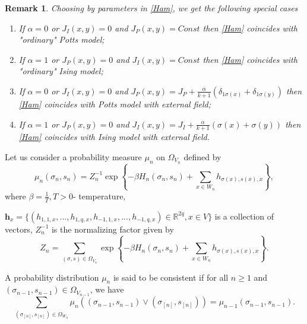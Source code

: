\documentclass[sn-mathphys]{sn-jnl}%
\theoremstyle{thmstyleone}%
\theoremstyle{thmstyletwo}%
\newtheorem{remark}{Remark}%
\theoremstyle{thmstylethree}%
\begin{document}
\begin{remark}\label{comp1} Choosing by parameters in \eqref{Ham}, we get the following special cases
\begin{enumerate}
\item If $\alpha=0$ or  $J_{I}(x,y)=0$ and $J_{P}(x,y)=Const$ then \eqref{Ham} coincides with "ordinary" Potts model;\\[2mm]
 \item If $\alpha=1$ or  $J_{P}(x,y)=0$ and $J_{I}(x,y)=Const$ then \eqref{Ham} coincides with "ordinary" Ising model;\\[2mm]
 \item If $\alpha=0$ or  $J_{I}(x,y)=0$ and $J_{P}(x,y)=J_{P}+\frac{\alpha}{k+1}\left(\delta_{1\sigma(x)}+\delta_{1\sigma(y)}\right)$ then \eqref{Ham} coincides with Potts model with external field;\\[2mm]
  \item If $\alpha=1$ or  $J_{P}(x,y)=0$ and $J_{I}(x,y)=J_{I}+\frac{\alpha}{k+1}\left(\sigma(x)+\sigma(y)\right)$ then \eqref{Ham} coincides with Ising model with external field.\\[2mm]
\end{enumerate}
\end{remark}
Let us consider a probability measure
$\mu_{n}$ on $\Omega_{V_n}$ defined by
\begin{equation}\label{mu}
\mu_{n}(\sigma_n, s_n)=Z_{n}^{-1}\exp\left\{-\beta H_n(\sigma_n,s_n)+\sum _{x\in
W_n}h_{\sigma(x),s(x),x}\right\},
\end{equation}
where $\beta=\frac{1}{T}, T>0$- temperature,

$\textbf{h}_x=\{\left(h_{1,1,x},...,h_{1,q,x},h_{-1,1,x},...,h_{-1,q,x}\right)\in\mathbb R^{2q},x\in V\}$ is a collection of vectors,
 $Z_{n}^{-1}$ is the normalizing factor given by
\begin{equation}\label{ZN1}
Z_{n}=\sum_{(\sigma,s)\in\Omega_{V_n}}\exp\left\{-\beta H_n(\sigma_n,s_n)+\sum _{x\in
W_n}h_{\sigma(x),s(x),x}\right\}.
\end{equation}

A probability distribution
$\mu _{n}$ is said to be consistent if for all $n\geq1$ and
$(\sigma _{n - 1},s_{n-1}) \in {\Omega _{{V_{n - 1}}}}$, we have
\begin{equation}\label{comcon}
\sum\limits_{(\sigma_{[n]}, s_{[n]})  \in {\Omega _{{W_n}}}} {\mu_{n}((\sigma_{n-1}, s_{n-1}) \vee (\sigma_{[n]}, s_{[n]})) = \mu _{n -
1}(\sigma_{n-1}, s_{n-1})}.
\end{equation}
\end{document}
